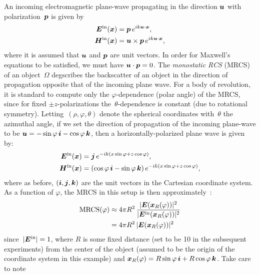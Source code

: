 \documentclass[11pt]{article}
\renewcommand{\phi}{\varphi}
\renewcommand{\vec}{\vectorsym}
\newcommand{\vct}{\vectorsym}
\newcommand{\bx}{\vct{ x}}
\newcommand{\bE}{\vectorsym{E}}
\newcommand\ihat{\vct{{i}}}
\newcommand\jhat{\vct{{j}}}
\newcommand\khat{\vct{{k}}}
\newcommand\bEin{\vct{E}^\textnormal{in}}
\newcommand\bHin{\vct{H}^\textnormal{in}}
\numberwithin{equation}{section}
\begin{document}
An incoming electromagnetic plane-wave propagating in the direction
$\vct{u}$ with polarization~$\vct{p}$ is given by
\begin{equation}
  \begin{aligned}
    \bEin(\bx) &= \vct{p}  \, e^{ik  {\vec{u}} \cdot \bx}, \\
    \bHin(\bx) &= \vec{u} \times \vct{p} \,
        e^{ik  \vec{u} \cdot \bx},
  \end{aligned}
\end{equation}
where it is assumed that $\vct{u}$ and $\vct{p}$ are unit vectors. In
order for Maxwell's equations to be satisfied, we must have
$\vct{u} \cdot \vct{p} = 0$. The \emph{monostatic RCS} (MRCS) of an
object~$\Omega$ degscribes the backscatter of an object in the
direction of propagation opposite that of the incoming plane wave. 
For a body of revolution, it is standard to compute
only the $\phi$-dependence (polar angle) of the MRCS,
since for fixed $\pm z$-polarizations
the~$\theta$-dependence is constant (due to rotational symmetry).
Letting~$(\rho,\phi,\theta)$
denote the spherical coordinates with~$\theta$ the azimuthal
angle, if we set the direction of propagation of the incoming
plane-wave to be $\vct{u} = -\sin\phi \, \ihat -\cos\phi \, \khat$,
then a horizontally-polarized plane wave is given by:
\begin{equation}
  \begin{aligned}
    \bEin(\bx) &= \jhat  \, e^{-ik(x\sin\phi + z\cos\phi)}, \\
    \bHin(\bx) &= (\cos\phi \, \ihat - \sin\phi \, \khat)  \,
        e^{-ik(x\sin\phi + z\cos\phi)},
  \end{aligned}
\end{equation}
where as before, $(\ihat, \jhat, \khat)$ are the unit vectors in the
Cartesian coordinate system.
As a function of $\phi$, the MRCS in this setup is then
approximately~\cite{jackson,jin-2010}:
\begin{equation}
  \begin{aligned}
    \text{MRCS} (\phi) &\approx 4\pi R^2 \,
    \frac{|\bE(\bx_R(\phi)) |^2}{| \bEin(\bx_R(\phi)) |^2} \\
    &= 4\pi R^2 \, |\bE(\bx_R(\phi)) |^2
  \end{aligned}
\end{equation}
since~$| \bEin | = 1$, where $R$ is some fixed distance (set to be 10
in the subsequent experiments) from the
center of the object (assumed to be the origin of the
coordinate system in this example) and
$\bx_R(\phi) = R\sin\phi \, \ihat + R\cos\phi \, \khat$.  Take care to note
\end{document}
